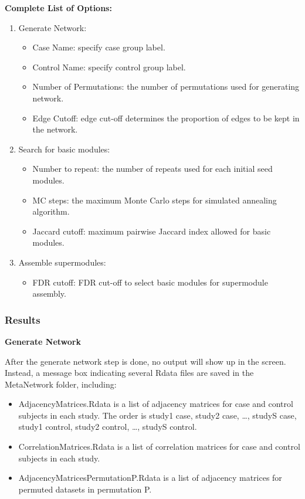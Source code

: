 \textbf{Complete List of Options:} 
\begin{enumerate}
\item Generate Network:
\begin{itemize}
\item Case Name: specify case group label.
\item Control Name: specify control group label.
\item Number of Permutations: the number of permutations used for generating network.
\item Edge Cutoff: edge cut-off  determines the proportion of edges to be kept in the network.
\end{itemize}

\item Search for basic modules:
\begin{itemize}
\item Number to repeat:  the number of repeats used for each initial seed modules.
\item MC steps:  the maximum Monte Carlo steps for simulated annealing algorithm.
\item Jaccard cutoff: maximum pairwise Jaccard index allowed for basic modules.
\end{itemize}
\item Assemble supermodules:

\begin{itemize}
\item FDR cutoff:  FDR cut-off to select basic modules for supermodule assembly.
\end{itemize}

\end{enumerate}

\subsubsection{Results}

\textbf{Generate Network}

After the generate network step is done, no output will show up in the screen. Instead, a message box indicating several Rdata files are saved in the MetaNetwork folder, including:

\begin{itemize}
\item AdjacencyMatrices.Rdata is a list of adjacency matrices for case and control subjects in each study. The order is study1 case, study2 case, \dots, studyS case, study1 control, study2 control, \dots, studyS control.
\item CorrelationMatrices.Rdata is a list of correlation matrices for case and control subjects in each study.
\item AdjacencyMatricesPermutationP.Rdata is a list of adjacency matrices for permuted datasets in permutation P.
\end{itemize}

